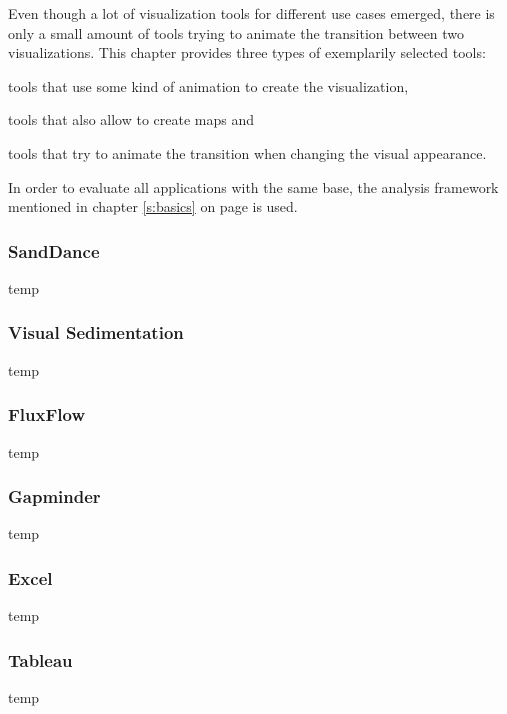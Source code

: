 Even though a lot of visualization tools for different use cases emerged, there is only a small amount of tools trying to animate the transition between two visualizations. This chapter provides three types of exemplarily selected tools:

\begin{enumerate*}
\item tools that use some kind of animation to create the visualization,
\item tools that also allow to create maps and
\item tools that try to animate the transition when changing the visual appearance.
\end{enumerate*}

In order to evaluate all applications with the same base, the analysis framework mentioned in chapter \ref{s:basics} on page \pageref{s:basics} is used.

\subsubsection{SandDance}
temp 

\subsubsection{Visual Sedimentation}
temp 


\subsubsection{FluxFlow}
temp 

\subsubsection{Gapminder}
temp

\subsubsection{Excel}
temp

\subsubsection{Tableau}
temp 